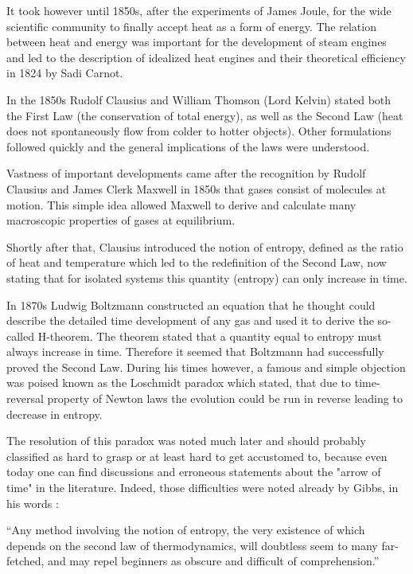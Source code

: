 \documentclass[a4paper,12pt]{article}
\begin{document}
It took however until 1850s, after the experiments of James Joule, for the wide scientific community to finally accept heat as a form of energy. The relation between heat and energy was important for the development of steam engines and led to the description of idealized heat engines and their theoretical efficiency in 1824 by Sadi Carnot. 

In the 1850s Rudolf Clausius and William Thomson (Lord Kelvin) stated both the First Law (the conservation of total energy), as well as the Second Law (heat does not spontaneously flow from colder to hotter objects). Other formulations followed quickly and the general implications of the laws were understood. 

Vastness of important developments came after the recognition by Rudolf Clausius and James Clerk Maxwell in 1850s that gases consist of molecules at motion. This simple idea allowed Maxwell to derive and calculate many macroscopic properties of gases at equilibrium. 

Shortly after that, Clausius introduced the notion of entropy, defined as the ratio of heat and temperature which led to the redefinition of the Second Law, now stating that for isolated systems this quantity (entropy) can only increase in time.

In 1870s Ludwig Boltzmann constructed an equation that he thought could describe the detailed time development of any gas and used it to derive the so-called H-theorem. The theorem stated that a quantity equal to entropy must always increase in time. Therefore it seemed that Boltzmann had successfully proved the Second Law. During his times however, a famous and simple objection was poised known as the Loschmidt paradox which stated, that due to time-reversal property of Newton laws the evolution could be run in reverse leading to decrease in entropy. 

The resolution of this paradox was noted much later and should probably classified as hard to grasp or at least hard to get accustomed to, because even today one can find discussions and erroneous statements about the "arrow of time" in the literature. Indeed, those difficulties were noted already by Gibbs, in his words \cite{Gibbs:1928tw}:

\begin{displayquote}
“Any method involving the notion of entropy, the very existence of which depends on the second law of thermodynamics, will doubtless seem to many far-fetched, and may repel beginners as obscure and difficult of comprehension.”
\end{displayquote}
\end{document}
